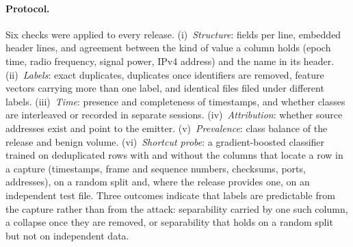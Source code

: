 \paragraph{Protocol.}
Six checks were applied to every release.
(i)~\emph{Structure}: fields per line, embedded header lines, and agreement between the
kind of value a column holds (epoch time, radio frequency, signal power, IPv4 address)
and the name in its header.
(ii)~\emph{Labels}: exact duplicates, duplicates once identifiers are removed, feature
vectors carrying more than one label, and identical files filed under different labels.
(iii)~\emph{Time}: presence and completeness of timestamps, and whether classes are
interleaved or recorded in separate sessions.
(iv)~\emph{Attribution}: whether source addresses exist and point to the emitter.
(v)~\emph{Prevalence}: class balance of the release and benign volume.
(vi)~\emph{Shortcut probe}: a gradient-boosted classifier trained on deduplicated rows
with and without the columns that locate a row in a capture (timestamps, frame and
sequence numbers, checksums, ports, addresses), on a random split and, where the release
provides one, on an independent test file. Three outcomes indicate that labels are
predictable from the capture rather than from the attack: separability carried by one
such column, a collapse once they are removed, or separability that holds on a random
split but not on independent data.

